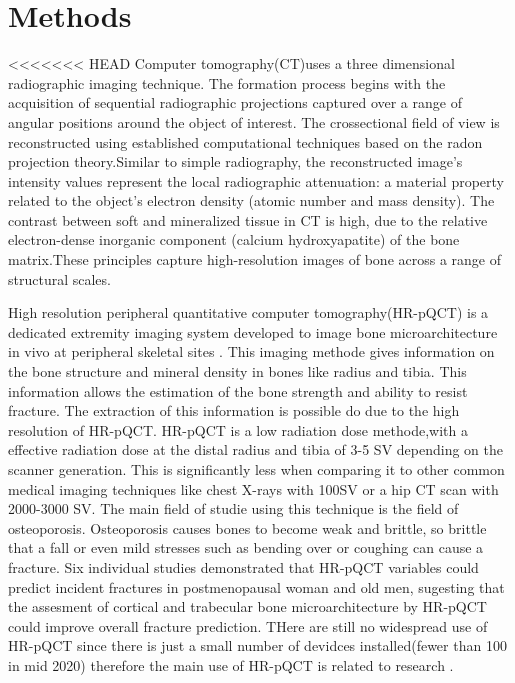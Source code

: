 \documentclass[
a4paper, 
12pt,
grayscalebody, %
abstract=on,
twoside, BCOR10mm, 12pt, DIV13,headinclude, footexclude, final, abstracton, openright
]{ibireprt}
\numberwithin{equation}{chapter}
\numberwithin{table}{chapter}
\numberwithin{figure}{chapter}
\numberwithin{algorithm}{chapter}
\numberwithin{example}{chapter}
\numberwithin{example}{chapter}
\begin{document}
\chapter{Methods}
<<<<<<< HEAD
Computer tomography(CT)uses a three dimensional radiographic imaging technique. The formation process begins with the acquisition of sequential radiographic projections captured over a range of angular positions around the object of interest. The crossectional field of view is reconstructed using established computational techniques based on the radon projection theory\cite{article}.Similar to simple radiography, the reconstructed image’s intensity values represent the local radiographic attenuation: a material property related to the object’s electron density (atomic number and mass density). The contrast between soft and mineralized tissue in CT is high, due to the relative electron-dense inorganic component (calcium hydroxyapatite) of the bone matrix.These principles capture high-resolution images of bone
across a range of structural scales. %

High resolution peripheral quantitative computer tomography(HR-pQCT) is a  dedicated extremity imaging system developed to image bone microarchitecture in vivo at peripheral skeletal sites \cite{Bergh2021}. This imaging methode gives information on the bone structure and mineral density in bones like radius and tibia. This information allows the estimation of the bone strength and ability to resist fracture. The extraction of this information is possible do due to the high resolution of HR-pQCT. HR-pQCT is a low radiation dose methode,with a effective radiation dose at the distal radius and tibia of  3-5 \textmu SV depending on the scanner  generation. This is significantly less when comparing it to other common medical imaging techniques like chest X-rays with 100\textmu SV or a hip CT scan with 2000-3000 \textmu SV. The main field of studie using this technique is the field of osteoporosis. Osteoporosis causes bones to become weak and brittle, so brittle that a fall or even mild stresses such as bending over or coughing can cause a fracture. Six individual studies demonstrated that HR-pQCT variables could predict incident fractures in postmenopausal woman and old men, sugesting that the assesment of cortical and trabecular bone microarchitecture by HR-pQCT could improve overall fracture prediction. THere are still no widespread use of HR-pQCT since there is just a small number of devidces installed(fewer than 100 in mid 2020) therefore the main use of HR-pQCT is related to research \cite{Bergh2021}.
\end{document}
